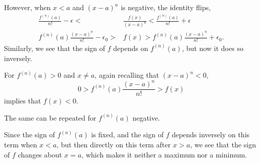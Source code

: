 \documentclass[../hw3]{subfiles}
\begin{document}
However, when $x<a$ and ${(x-a)}^n$ is negative, the identity flips,
\begin{align*}
    \frac{f^{(n)}(a)}{n!} - \epsilon < &\frac{f(x)}{{(x-a)}^n} < \frac{f^{(n)}(a)}{n!} + \epsilon \\
    f^{(n)}(a)\frac{{(x-a)}^n}{n!} - \epsilon_0 > &f(x) > f^{(n)}(a)\frac{{(x-a)}^n}{n!} + \epsilon_0.
\end{align*}
Similarly, we see that the sign of $f$ depends on $f^{(n)}(a)$, but now it does so inversely.

For $f^{(n)}(a)>0$ and $x \neq a$, again recalling that ${(x-a)}^n<0$,
\[0>f^{(n)}(a)\frac{{(x-a)}^n}{n!}>f(x)\]
implies that $f(x)<0$.

The same can be repeated for $f^{(n)}(a)$ negative.

Since the sign of $f^{(n)}(a)$ is fixed, and the sign of $f$ depends inversely on this term when $x<a$, but then directly on this term after $x>a$, we see that the sign of $f$ changes about $x=a$, which makes it neither a maximum nor a minimum.
\end{document}
